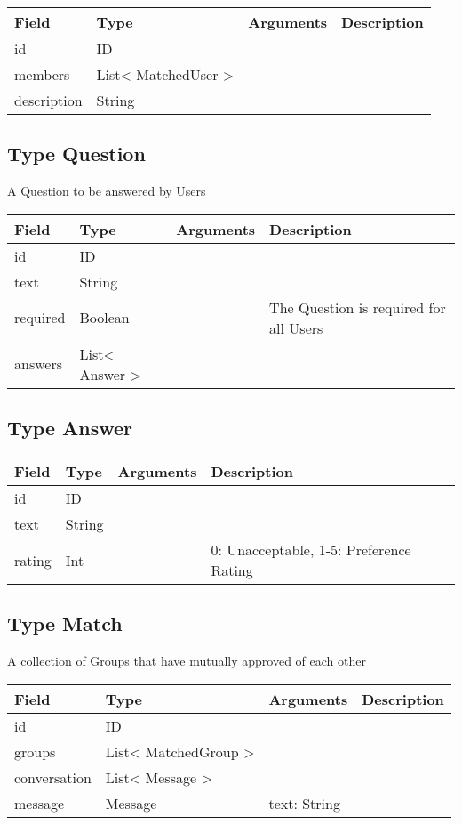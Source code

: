 \begin{longtable}[]{@{}llll@{}}
\toprule
Field & Type & Arguments & Description\tabularnewline
\midrule
\endhead
id & ID & &\tabularnewline
members & List\textless{} MatchedUser \textgreater{} & &\tabularnewline
description & String & &\tabularnewline
\bottomrule
\end{longtable}

\hypertarget{type-question}{%
\subsection{Type Question}\label{type-question}}

A Question to be answered by Users

\begin{longtable}[]{@{}llll@{}}
\toprule
Field & Type & Arguments & Description\tabularnewline
\midrule
\endhead
id & ID & &\tabularnewline
text & String & &\tabularnewline
required & Boolean & & The Question is required for all
Users\tabularnewline
answers & List\textless{} Answer \textgreater{} & &\tabularnewline
\bottomrule
\end{longtable}

\hypertarget{type-answer}{%
\subsection{Type Answer}\label{type-answer}}

\begin{longtable}[]{@{}llll@{}}
\toprule
Field & Type & Arguments & Description\tabularnewline
\midrule
\endhead
id & ID & &\tabularnewline
text & String & &\tabularnewline
rating & Int & & 0: Unacceptable, 1-5: Preference Rating\tabularnewline
\bottomrule
\end{longtable}

\hypertarget{type-match}{%
\subsection{Type Match}\label{type-match}}

A collection of Groups that have mutually approved of each other

\begin{longtable}[]{@{}llll@{}}
\toprule
Field & Type & Arguments & Description\tabularnewline
\midrule
\endhead
id & ID & &\tabularnewline
groups & List\textless{} MatchedGroup \textgreater{} & &\tabularnewline
conversation & List\textless{} Message \textgreater{} & &\tabularnewline
message & Message & text: String &\tabularnewline
\bottomrule
\end{longtable}

